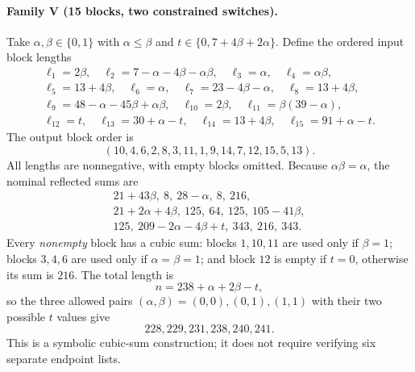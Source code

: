 \documentclass[10pt]{article}
\begin{document}
\paragraph{Family V (15 blocks, two constrained switches).}
Take $\alpha,\beta\in\{0,1\}$ with
$\alpha\le\beta$ and
$t\in\{0,7+4\beta+2\alpha\}$.
Define the ordered input block lengths
\[
\begin{gathered}
\ell_1=2\beta,\quad
\ell_2=7-\alpha-4\beta-\alpha\beta,\quad
\ell_3=\alpha,\quad\ell_4=\alpha\beta,\\
\ell_5=13+4\beta,\quad\ell_6=\alpha,\quad
\ell_7=23-4\beta-\alpha,\quad\ell_8=13+4\beta,\\
\ell_9=48-\alpha-45\beta+\alpha\beta,\quad
\ell_{10}=2\beta,\quad\ell_{11}=\beta(39-\alpha),\\
\ell_{12}=t,\quad\ell_{13}=30+\alpha-t,\quad
\ell_{14}=13+4\beta,\quad
\ell_{15}=91+\alpha-t.
\end{gathered}
\]
The output block order is
\[
(10,4,6,2,8,3,11,1,9,14,7,12,15,5,13).
\]
All lengths are nonnegative, with empty blocks omitted.
Because $\alpha\beta=\alpha$, the nominal reflected
sums are
\[
\begin{gathered}
21+43\beta,\ 8,\ 28-\alpha,\ 8,\ 216,\\
21+2\alpha+4\beta,\ 125,\ 64,\ 125,\ 105-41\beta,\\
125,\ 209-2\alpha-4\beta+t,\ 343,\ 216,\ 343.
\end{gathered}
\]
Every \emph{nonempty} block has a cubic sum:
blocks $1,10,11$ are used only if $\beta=1$;
blocks $3,4,6$ are used only if
$\alpha=\beta=1$; and block $12$ is empty
if $t=0$, otherwise its sum is $216$.
The total length is
\[
\boxed{n=238+\alpha+2\beta-t},
\]
so the three allowed pairs
$(\alpha,\beta)=(0,0),(0,1),(1,1)$
with their two possible $t$ values give
\[
\boxed{228,229,231,238,240,241}.
\]
This is a symbolic cubic-sum construction;
it does not require verifying six separate endpoint lists.
\end{document}
